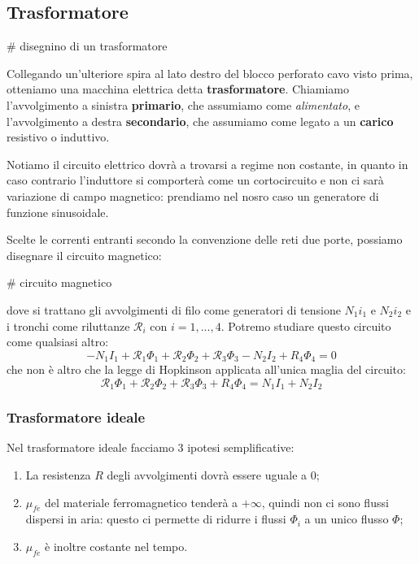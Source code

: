 \documentclass[a4paper,11pt]{article}
\begin{document}
\subsection{Trasformatore}

# disegnino di un trasformatore

Collegando un'ulteriore spira al lato destro del blocco perforato cavo visto prima, otteniamo una macchina elettrica detta \textbf{trasformatore}.
Chiamiamo l'avvolgimento a sinistra \textbf{primario}, che assumiamo come \textit{alimentato}, e l'avvolgimento a destra \textbf{secondario}, che assumiamo come legato a un \textbf{carico} resistivo o induttivo.

Notiamo il circuito elettrico dovrà a trovarsi a regime non costante, in quanto in caso contrario l'induttore si comporterà come un cortocircuito e non ci sarà variazione di campo magnetico: prendiamo nel nosro caso un generatore di funzione sinusoidale.

Scelte le correnti entranti secondo la convenzione delle reti due porte, possiamo disegnare il circuito magnetico:

# circuito magnetico

dove si trattano gli avvolgimenti di filo come generatori di tensione $N_1 i_1$ e $N_2 i_2$ e i tronchi come riluttanze $\mathcal{R}_i$ con $i = 1, ..., 4$.
Potremo studiare questo circuito come qualsiasi altro:
$$
-N_1 I_1 + \mathcal{R}_1 \Phi_1 + \mathcal{R}_2 \Phi_2 + \mathcal{R}_3 \Phi_3 - N_2 I_2 + R_4 \Phi_4 = 0
$$
che non è altro che la legge di Hopkinson applicata all'unica maglia del circuito:
$$
\mathcal{R}_1 \Phi_1 + \mathcal{R}_2 \Phi_2 + \mathcal{R}_3 \Phi_3 + R_4 \Phi_4 = N_1 I_1 + N_2 I_2
$$

\subsubsection{Trasformatore ideale}
Nel trasformatore ideale facciamo 3 ipotesi semplificative:
\begin{enumerate}
	\item La resistenza $R$ degli avvolgimenti dovrà essere uguale a 0;
	\item $\mu_{fe}$ del materiale ferromagnetico tenderà a $+\infty$, quindi non ci sono flussi dispersi in aria: questo ci permette di ridurre i flussi $\Phi_i$ a un unico flusso $\Phi$;
	\item $\mu_{fe}$ è inoltre costante nel tempo.
\end{enumerate}
\end{document}
